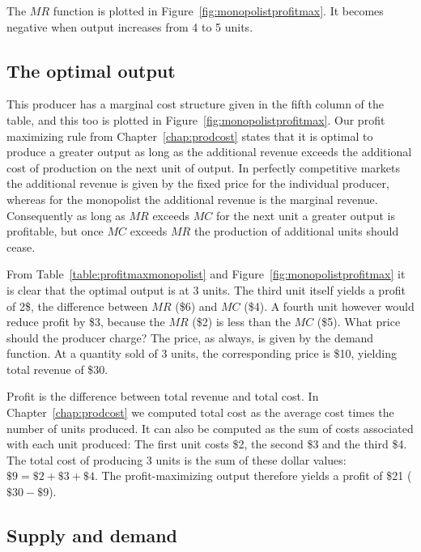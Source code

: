 \newhtmlpage

The $MR$ function is plotted in Figure~\ref{fig:monopolistprofitmax}. It
becomes negative when output increases from 4 to 5 units.



\newhtmlpage

\subsection*{The optimal output}

This producer has a marginal cost structure given in the fifth column of the
table, and this too is plotted in Figure~\ref{fig:monopolistprofitmax}. Our
profit maximizing rule from Chapter~\ref{chap:prodcost} states that it is
optimal to produce a greater output as long as the additional revenue
exceeds the additional cost of production on the next unit of output. In
perfectly competitive markets the additional revenue is given by the fixed
price for the individual producer, whereas for the monopolist the additional
revenue is the marginal revenue. Consequently as long as $MR$ exceeds $MC$
for the next unit a greater output is profitable, but once $MC$ exceeds $MR$
the production of additional units should cease.

From Table~\ref{table:profitmaxmonopolist} and Figure~\ref{fig:monopolistprofitmax}
it is clear that the optimal output is at 3 units.
The third unit itself yields a profit of 2\$, the difference between $MR$
(\$6) and $MC$ (\$4). A fourth unit however would reduce profit by \$3,
because the $MR$ (\$2) is less than the $MC$ (\$5). What price should the
producer charge? The price, as always, is given by the demand function. At a
quantity sold of 3 units, the corresponding price is \$10, yielding total
revenue of \$30.

Profit is the difference between total revenue and total cost. In Chapter~\ref{chap:prodcost}
we computed total cost as the average cost times the
number of units produced. It can also be computed as the sum of costs
associated with each unit produced: The first unit costs \$2, the second \$3
and the third \$4. The total cost of producing 3 units is the sum of these
dollar values: $\$9=\$2+\$3+\$4$. The profit-maximizing output therefore
yields a profit of \$21 ($\$30-\$9$).

\newhtmlpage

\subsection*{Supply and demand}

